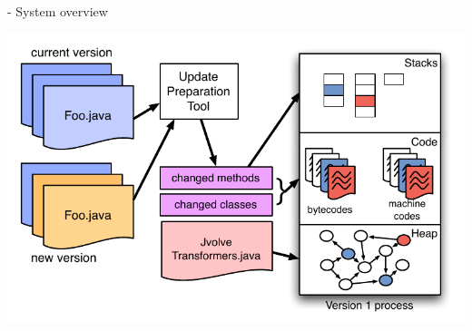 

\begin{frame}{\DSU{} - System overview}%
\begin{center}%
\includegraphics[width=0.93\paperwidth]{images/developers-view}%
\end{center}%
\end{frame}


